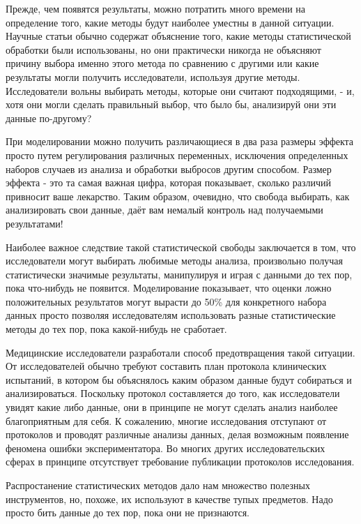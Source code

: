 Прежде, чем появятся результаты, можно потратить много времени на определение того, какие методы будут наиболее уместны в данной ситуации. Научные статьи обычно содержат объяснение того, какие методы статистической обработки были использованы, но они практически никогда не объясняют причину выбора именно этого метода по сравнению с другими или какие результаты могли получить исследователи, используя другие методы. Исследователи вольны выбирать методы, которые они считают подходящими, - и, хотя они могли сделать правильный выбор, что было бы, анализируй они эти данные по-другому?    

При моделировании можно получить различающиеся в два раза размеры эффекта просто путем регулирования различных переменных, исключения определенных наборов случаев из анализа и обработки выбросов другим способом.\cite{ioannidis_why_2008} Размер эффекта - это та самая важная цифра, которая показывает, сколько различий привносит ваше лекарство. Таким образом, очевидно, что свобода выбирать, как анализировать свои данные, даёт вам немалый контроль над получаемыми результатами!  

Наиболее важное следствие такой статистической свободы заключается в том, что исследователи могут выбирать любимые методы анализа, произвольно получая статистически значимые результаты, манипулируя и играя с данными до тех пор, пока что-нибудь не появится. Моделирование показывает, что оценки ложно положительных результатов могут вырасти до 50\% для конкретного набора данных просто позволяя исследователям использовать разные статистические методы до тех пор, пока какой-нибудь не сработает.\cite{simmons_false-positive_2011}

Медицинские исследователи разработали способ предотвращения такой ситуации. От исследователей обычно требуют составить план протокола клинических испытаний, в котором бы объяснялось каким образом данные будут собираться и анализироваться. Поскольку протокол составляется до того, как исследователи увидят какие либо данные, они в принципе не могут сделать анализ наиболее благоприятным для себя. К сожалению, многие исследования отступают от протоколов и проводят различные анализы данных, делая возможным появление феномена ошибки экспериментатора.\cite{chan_discrepancies_2008,chan_empirical_2004} Во многих других исследовательских сферах в принципе отсутствует требование публикации протоколов исследования.

Распростанение статистических методов дало нам множество полезных инструментов, но, похоже, их используют в качестве тупых предметов. Надо просто бить данные до тех пор, пока они не признаются.
